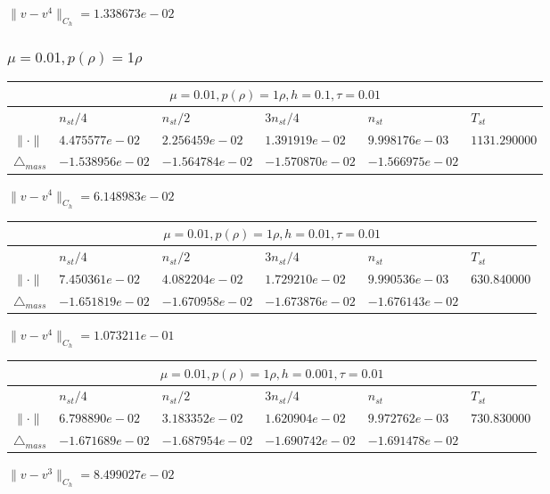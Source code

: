 $\|v-v^{4}\|_{C_h} = 1.338673e-02$

\subsubsection{$\mu = 0.01, p(\rho) = 1\rho $}

\begin{tabular}{*{6}{|l}|}
    \hline
     \\
    \hline
    &$n_{st}/4 $&$ n_{st}/2$&$3n_{st}/4$&$n_{st}$&$T_{st}$ \\
    \hline
$\|\cdot \|$& $4.475577e-02$ & $2.256459e-02$ & $1.391919e-02$ & $9.998176e-03$ &$1131.290000$\\
\hline
$\triangle_{mass}$& $-1.538956e-02$ & $-1.564784e-02$ & $-1.570870e-02$ & $-1.566975e-02$ &\\
\hline    
\end{tabular}

$\|v-v^{4}\|_{C_h} = 6.148983e-02$


\begin{tabular}{*{6}{|l}|}
    \hline
     \\
    \hline
    &$n_{st}/4 $&$ n_{st}/2$&$3n_{st}/4$&$n_{st}$&$T_{st}$ \\
    \hline
$\|\cdot \|$& $7.450361e-02$ & $4.082204e-02$ & $1.729210e-02$ & $9.990536e-03$ &$630.840000$\\
\hline
$\triangle_{mass}$& $-1.651819e-02$ & $-1.670958e-02$ & $-1.673876e-02$ & $-1.676143e-02$ &\\
\hline
\end{tabular}

$\|v-v^{4}\|_{C_h} = 1.073211e-01$


\begin{tabular}{*{6}{|l}|}
    \hline
     \\
    \hline
    &$n_{st}/4 $&$ n_{st}/2$&$3n_{st}/4$&$n_{st}$&$T_{st}$ \\
    \hline
    $\|\cdot \|$& $6.798890e-02$ & $3.183352e-02$ & $1.620904e-02$ & $9.972762e-03$ &$730.830000$\\
\hline
$\triangle_{mass}$& $-1.671689e-02$ & $-1.687954e-02$ & $-1.690742e-02$ & $-1.691478e-02$ &\\
\hline
\end{tabular}

$\|v-v^{3}\|_{C_h} = 8.499027e-02$


